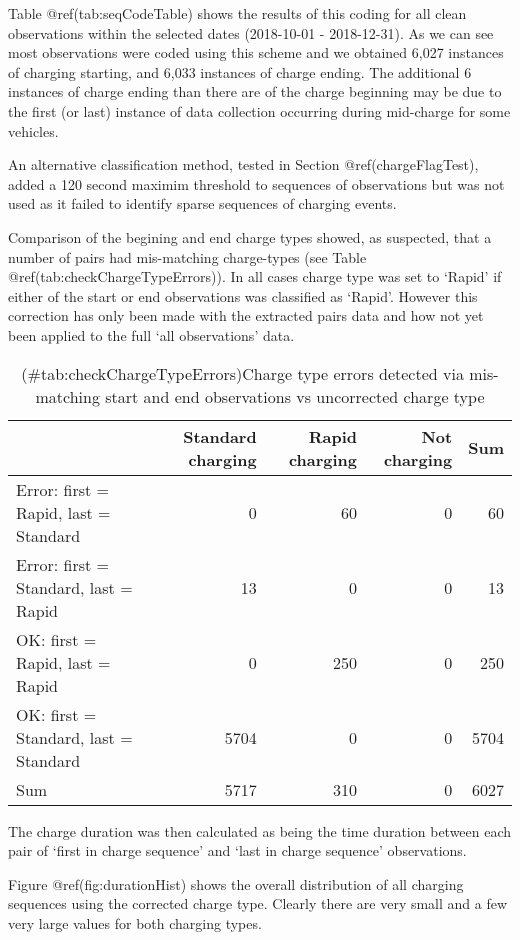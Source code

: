 \documentclass[]{article}
\begin{document}
Table @ref(tab:seqCodeTable) shows the results of this coding for all clean observations within the selected dates (2018-10-01 - 2018-12-31). As we can see most observations were coded using this scheme and we obtained 6,027 instances of charging starting, and 6,033 instances of charge ending. The additional 6 instances of charge ending than there are of the charge beginning may be due to the first (or last) instance of data collection occurring during mid-charge for some vehicles.

An alternative classification method, tested in Section @ref(chargeFlagTest), added a 120 second maximim threshold to sequences of observations but was not used as it failed to identify sparse sequences of charging events.

Comparison of the begining and end charge types showed, as suspected, that a number of pairs had mis-matching charge-types (see Table @ref(tab:checkChargeTypeErrors)). In all cases charge type was set to `Rapid' if either of the start or end observations was classified as `Rapid'. However this correction has only been made with the extracted pairs data and how not yet been applied to the full `all observations' data.

\begin{table}[t]

\caption{(\#tab:checkChargeTypeErrors)Charge type errors detected via mis-matching start and end observations vs uncorrected charge type}
\centering
\begin{tabular}{l|r|r|r|r}
\hline
  & Standard charging & Rapid charging & Not charging & Sum\\
\hline
Error: first = Rapid, last = Standard & 0 & 60 & 0 & 60\\
\hline
Error: first = Standard, last = Rapid & 13 & 0 & 0 & 13\\
\hline
OK: first = Rapid, last = Rapid & 0 & 250 & 0 & 250\\
\hline
OK: first = Standard, last = Standard & 5704 & 0 & 0 & 5704\\
\hline
Sum & 5717 & 310 & 0 & 6027\\
\hline
\end{tabular}
\end{table}

The charge duration was then calculated as being the time duration between each pair of `first in charge sequence' and `last in charge sequence' observations.

Figure @ref(fig:durationHist) shows the overall distribution of all charging sequences using the corrected charge type. Clearly there are very small and a few very large values for both charging types.
\end{document}
